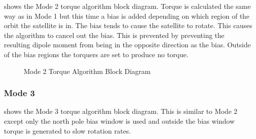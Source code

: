  shows the Mode 2 torque algorithm block diagram. Torque is calculated the same way as in Mode 1 but this time a bias is added depending on which region of the orbit the satellite is in. The bias tends to cause the satellite to rotate. This causes the algorithm to cancel out the bias. This is prevented by preventing the resulting dipole moment from being in the opposite direction as the bias. Outside of the bias regions the torquers are set to produce no torque.

\begin{figure}[H]
    \centering
    \caption{Mode 2 Torque Algorithm Block Diagram}
    \label{fig:mode2}
\end{figure}

\subsubsection{Mode 3}

 shows the Mode 3 torque algorithm block diagram. This is similar to Mode 2 except only the north pole bias window is used and outside the bias window torque is generated to slow rotation rates.

